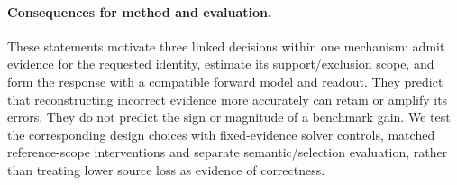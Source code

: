 \paragraph{Consequences for method and evaluation.}
These statements motivate three linked decisions within one mechanism:
admit evidence for the requested identity, estimate its support/exclusion
scope, and form the response with a compatible forward model and readout.
They predict that reconstructing incorrect evidence more accurately can retain
or amplify its errors. They do not predict the sign or magnitude of a benchmark
gain. We test the corresponding design choices with fixed-evidence solver
controls, matched reference-scope interventions and separate semantic/selection
evaluation, rather than treating lower source loss as evidence of correctness.
